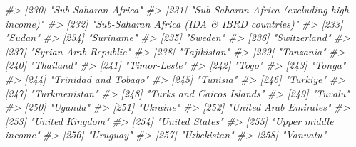 \documentclass[
  xelatex, ja=standard]{bxjsbook}
\newenvironment{Shaded}{\begin{snugshade}}{\end{snugshade}}
\newcommand{\CommentTok}[1]{\textcolor[rgb]{0.56,0.35,0.01}{\textit{#1}}}
\theoremstyle{definition}
\theoremstyle{definition}
\theoremstyle{definition}
\theoremstyle{definition}
\theoremstyle{remark}
\begin{document}
\begin{Shaded}
\begin{Highlighting}[]
\CommentTok{\#\textgreater{} [230] "Sub{-}Saharan Africa"                                  }
\CommentTok{\#\textgreater{} [231] "Sub{-}Saharan Africa (excluding high income)"          }
\CommentTok{\#\textgreater{} [232] "Sub{-}Saharan Africa (IDA \& IBRD countries)"           }
\CommentTok{\#\textgreater{} [233] "Sudan"                                               }
\CommentTok{\#\textgreater{} [234] "Suriname"                                            }
\CommentTok{\#\textgreater{} [235] "Sweden"                                              }
\CommentTok{\#\textgreater{} [236] "Switzerland"                                         }
\CommentTok{\#\textgreater{} [237] "Syrian Arab Republic"                                }
\CommentTok{\#\textgreater{} [238] "Tajikistan"                                          }
\CommentTok{\#\textgreater{} [239] "Tanzania"                                            }
\CommentTok{\#\textgreater{} [240] "Thailand"                                            }
\CommentTok{\#\textgreater{} [241] "Timor{-}Leste"                                         }
\CommentTok{\#\textgreater{} [242] "Togo"                                                }
\CommentTok{\#\textgreater{} [243] "Tonga"                                               }
\CommentTok{\#\textgreater{} [244] "Trinidad and Tobago"                                 }
\CommentTok{\#\textgreater{} [245] "Tunisia"                                             }
\CommentTok{\#\textgreater{} [246] "Turkiye"                                             }
\CommentTok{\#\textgreater{} [247] "Turkmenistan"                                        }
\CommentTok{\#\textgreater{} [248] "Turks and Caicos Islands"                            }
\CommentTok{\#\textgreater{} [249] "Tuvalu"                                              }
\CommentTok{\#\textgreater{} [250] "Uganda"                                              }
\CommentTok{\#\textgreater{} [251] "Ukraine"                                             }
\CommentTok{\#\textgreater{} [252] "United Arab Emirates"                                }
\CommentTok{\#\textgreater{} [253] "United Kingdom"                                      }
\CommentTok{\#\textgreater{} [254] "United States"                                       }
\CommentTok{\#\textgreater{} [255] "Upper middle income"                                 }
\CommentTok{\#\textgreater{} [256] "Uruguay"                                             }
\CommentTok{\#\textgreater{} [257] "Uzbekistan"                                          }
\CommentTok{\#\textgreater{} [258] "Vanuatu"                                             }

\end{Highlighting}
\end{Shaded}
\end{document}
